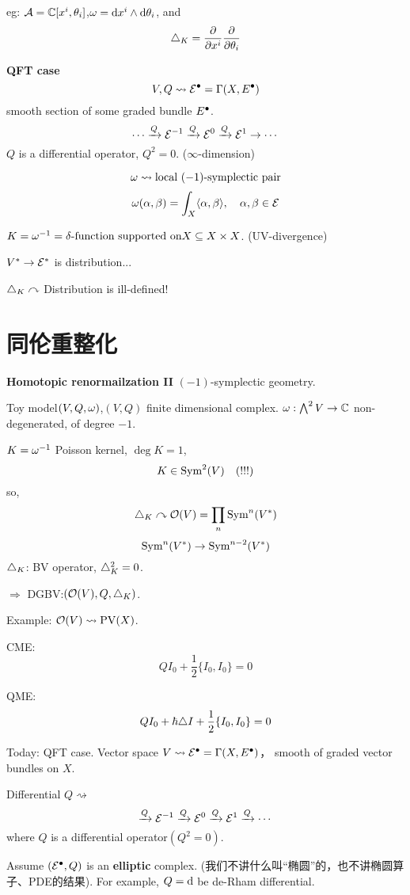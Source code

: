 eg: $\mathcal{A}=\mathbb{C}[x^i,\theta_i]$,$\omega=\mathrm{d} x^i\wedge\mathrm{d}\theta_i$, and
$$\triangle_K=\frac{\partial } {\partial x^i}\frac{\partial } {\partial \theta_i}$$

\textbf{QFT case}
$$V,Q\rightsquigarrow
\mathcal{E}^{\bullet}=\Gamma(X,E^{\bullet})$$
smooth section of some graded bundle $E^{\bullet}$.
$$\cdots\xrightarrow{Q}\mathcal{E}^{-1}\xrightarrow{Q}\mathcal{E}^0\xrightarrow{Q}\mathcal{E}^1\to\cdots$$
$Q$ is a differential operator, $Q^2=0$. ($\infty$-dimension)

$$\omega\rightsquigarrow\text{local $(-1)$-symplectic pair}$$
$$\omega(\alpha,\beta)=\int_X\langle\alpha,\beta\rangle,\quad\alpha,\beta\in\mathcal{E}$$

$K=\omega^{-1}=\delta\text{-function supported on} X\subseteq X\times X$.
(UV-divergence)

$V^*\to\mathcal{E}^*$ is distribution...

$\triangle_K\curvearrowright$ Distribution is ill-defined!


\section{同伦重整化}
\textbf{Homotopic renormailzation II}
$(-1)$-symplectic geometry.

Toy model$(V,Q,\omega)$,$(V,Q)$ finite dimensional complex.
$\omega:\bigwedge\nolimits^{2}V\to\mathbb{C}$
non-degenerated, of degree $-1$.

$K=\omega^{-1}$ Poisson kernel, $\deg K=1$,
$$K\in\operatorname{Sym}^2(V)\quad (!!!)$$
so,
$$\triangle_K\curvearrowright\mathcal{O}(V)=\prod_{n}\operatorname{Sym}^n(V^*)$$
$$\operatorname{Sym}^n(V^*)\to\operatorname{Sym}^{n-2}(V^*)$$
$\triangle_K$: BV operator, $\triangle_K^2=0$.

$\Rightarrow$ DGBV:$(\mathcal{O}(V),Q,\triangle_K)$.

Example: $\mathcal{O}(V)\rightsquigarrow\operatorname{PV}(X)$.

CME:
$$QI_0+\frac{1}{2}\{I_0,I_0\}=0$$

QME:
$$QI_0+\hbar\triangle I+\frac{1}{2}\{I_0,I_0\}=0$$

Today: QFT case.
Vector space $V\rightsquigarrow\mathcal{E}^{\bullet}=\Gamma(X,E^{\bullet})$，
smooth of graded vector bundles on $X$.

Differential $Q\rightsquigarrow$
$$\xrightarrow{Q}\mathcal{E}^{-1}\xrightarrow{Q}\mathcal{E}^{0}\xrightarrow{Q}\mathcal{E}^{1}\xrightarrow{Q}\cdots$$
where $Q$ is a differential operator$(Q^2=0)$.

Assume $(\mathcal{E}^{\bullet},Q)$ is an \textbf{elliptic} complex.
(我们不讲什么叫“椭圆”的，也不讲椭圆算子、PDE的结果).
For example, $Q=\mathrm{d}$ be de-Rham differential.


